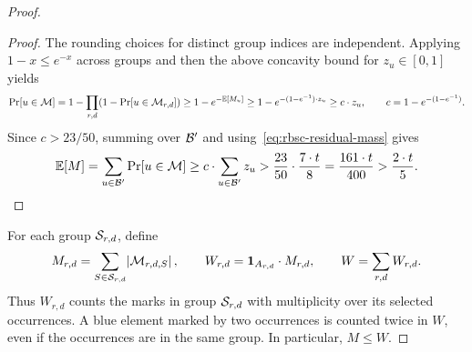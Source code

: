 \begin{proof}
\begin{proof}
The rounding choices for distinct group indices are independent. Applying $1-x\leq e^{-x}$ across groups and then the above concavity bound for $z_u\in[0,1]$ yields
\[
 \Pr[u\in\mathcal{M}]
 =1-\prod_{r,d}\mathopen{}\left( 1-\Pr[u\in\mathcal{M}_{r,d}] \right)
 \geq1-e^{-\mathbb{E}[M_u]}
 \geq1-e^{-(1-e^{-1})\cdot z_u}
 \geq c\cdot z_u,
 \qquad c=1-e^{-(1-e^{-1})}.
\]
Since $c>23/50$, summing over $\mathcal{B}'$ and using~\eqref{eq:rbsc-residual-mass} gives
\[
 \mathbb{E}[M]=\sum_{u\in\mathcal{B}'}\Pr[u\in\mathcal{M}]\geq c\cdot\sum_{u\in\mathcal{B}'}z_u
 >\frac{23}{50}\cdot\frac{7\cdot t}{8}
 =\frac{161\cdot t}{400}>\frac{2\cdot t}{5}.
\]
\end{proof}

For each group $\mathcal{S}_{r,d}$, define
\[
 M_{r,d}=\sum_{S\in\mathcal{S}_{r,d}}\mathopen{}\left| \mathcal{M}_{r,d,S} \right|,
 \qquad W_{r,d}=\boldsymbol{1}_{A_{r,d}}\cdot M_{r,d},
 \qquad W=\sum_{r,d}W_{r,d}.
\]
Thus $W_{r,d}$ counts the marks in group $\mathcal{S}_{r,d}$ with multiplicity over its selected occurrences. A blue element marked by two occurrences is counted twice in $W$, even if the occurrences are in the same group. In particular, $M\leq W$.


\end{proof}
